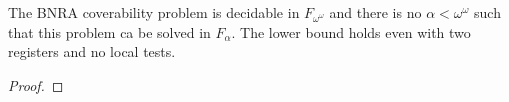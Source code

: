 \begin{theorem}
	The BNRA coverability problem is decidable in $F_{\omega^\omega}$ and there is no $\alpha < \omega^\omega$ such that this problem ca be solved in $F_{\alpha}$.
	The lower bound holds even with two registers and no local tests.
\end{theorem}

\ifproofs
\begin{proof}
\end{proof}
\fi

